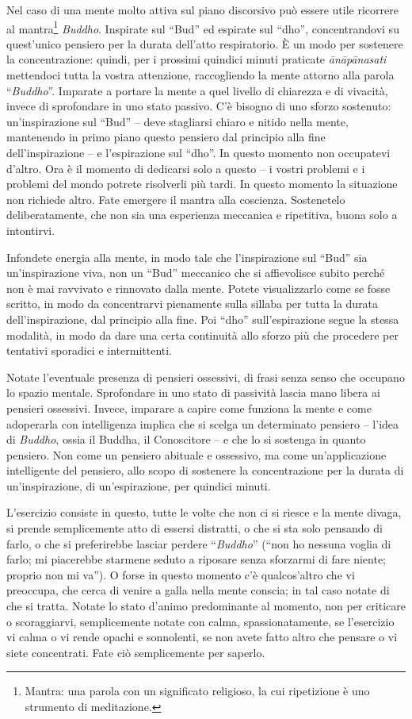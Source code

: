 
Nel caso di una mente molto attiva sul piano discorsivo può essere utile
ricorrere al mantra\footnote{Mantra: una parola con un significato religioso, la cui
ripetizione è uno strumento di meditazione.} \textit{Buddho}. Inspirate sul ``Bud'' ed espirate
sul ``dho'', concentrandovi su quest'unico pensiero per la durata
dell'atto respiratorio. È un modo per sostenere la concentrazione:
quindi, per i prossimi quindici minuti praticate \textit{ānāpānasati} mettendoci
tutta la vostra attenzione, raccogliendo la mente attorno alla parola
``\textit{Buddho}''. Imparate a portare la mente a quel livello di chiarezza e di
vivacità, invece di sprofondare in uno stato passivo. C'è bisogno di uno
sforzo sostenuto: un'inspirazione sul ``Bud'' – deve stagliarsi chiaro e
nitido nella mente, mantenendo in primo piano questo pensiero dal
principio alla fine dell'inspirazione – e l'espirazione sul ``dho''. In
questo momento non occupatevi d'altro. Ora è il momento di dedicarsi
solo a questo – i vostri problemi e i problemi del mondo potrete
risolverli più tardi. In questo momento la situazione non richiede
altro. Fate emergere il mantra alla coscienza. Sostenetelo
deliberatamente, che non sia una esperienza meccanica e ripetitiva,
buona solo a intontirvi.

Infondete energia alla mente, in modo tale che
l'inspirazione sul ``Bud'' sia un'inspirazione viva, non un ``Bud''
meccanico che si affievolisce subito perché non è mai ravvivato e
rinnovato dalla mente. Potete visualizzarlo come se fosse scritto, in
modo da concentrarvi pienamente sulla sillaba per tutta la durata
dell'inspirazione, dal principio alla fine. Poi ``dho'' sull'espirazione
segue la stessa modalità, in modo da dare una certa continuità allo
sforzo più che procedere per tentativi sporadici e intermittenti.

Notate l'eventuale presenza di pensieri ossessivi, di frasi senza senso
che occupano lo spazio mentale. Sprofondare in uno stato di passività
lascia mano libera ai pensieri ossessivi. Invece, imparare a capire come
funziona la mente e come adoperarla con intelligenza implica che si
scelga un determinato pensiero – l'idea di \textit{Buddho}, ossia il Buddha, il
Conoscitore – e che lo si sostenga in quanto pensiero. Non come un
pensiero abituale e ossessivo, ma come un'applicazione intelligente del
pensiero, allo scopo di sostenere la concentrazione per la durata di
un'inspirazione, di un'espirazione, per quindici minuti.

L'esercizio consiste in questo, tutte le volte che non ci si riesce e la
mente divaga, si prende semplicemente atto di essersi distratti, o che
si sta solo pensando di farlo, o che si preferirebbe lasciar perdere
``\textit{Buddho}'' (``non ho nessuna voglia di farlo; mi piacerebbe starmene seduto
a riposare senza sforzarmi di fare niente; proprio non mi va''). O forse
in questo momento c'è qualcos'altro che vi preoccupa, che cerca di
venire a galla nella mente conscia; in tal caso notate di che si tratta.
Notate lo stato d'animo predominante al momento, non per criticare o
scoraggiarvi, semplicemente notate con calma, spassionatamente, se
l'esercizio vi calma o vi rende opachi e sonnolenti, se non avete fatto
altro che pensare o vi siete concentrati. Fate ciò semplicemente per
saperlo.

